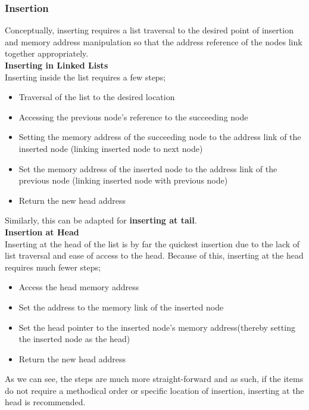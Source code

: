 \documentclass[11pt]{article}
\begin{document}
\subsubsection{Insertion}
Conceptually, inserting requires a list traversal to the desired point of insertion and memory address manipulation so that the address reference of the nodes link together appropriately.\\[0.5\baselineskip]
\textbf{Inserting in Linked Lists}\\
Inserting inside the list requires a few steps;
\begin{itemize}
    \item Traversal of the list to the desired location
    \item Accessing the previous node's reference to the succeeding node
    \item Setting the memory address of the succeeding node to the address link of the inserted node (linking inserted node to next node)
    \item Set the memory address of the inserted node to the address link of the previous node (linking inserted node with previous node)
    \item Return the new head address
\end{itemize}
Similarly, this can be adapted for \textbf{inserting at tail}.\\[.5 \baselineskip]
\textbf{Insertion at Head}\\
Inserting at the head of the list is by far the quickest insertion due to the lack of list traversal and ease of access to the head. Because of this, inserting at the head requires much fewer steps;
\begin{itemize}
    \item Access the head memory address
    \item Set the address to the memory link of the inserted node
    \item Set the head pointer to the inserted node's memory address(thereby setting the inserted node as the head)
    \item Return the new head address
\end{itemize}
As we can see, the steps are much more straight-forward and as such, if the items do not require a methodical order or specific location of insertion, inserting at the head is recommended.
\end{document}
